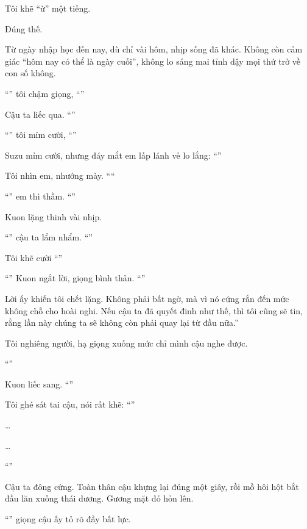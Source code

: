 \documentclass[../main.tex]{subfiles}
\begin{document}
Tôi khẽ ``ừ'' một tiếng.

Đúng thế.

Từ ngày nhập học đến nay, dù chỉ vài hôm, nhịp sống đã khác. Không còn cảm giác ``hôm nay có thể là ngày cuối'', không lo sáng mai tỉnh dậy mọi thứ trở về con số không.

``'' tôi chậm giọng, ``''

Cậu ta liếc qua. ``''

``'' tôi mỉm cười, ``''

Suzu mỉm cười, nhưng đáy mắt em lấp lánh vẻ lo lắng: ``''

Tôi nhìn em, nhướng mày. ````

``'' em thì thầm. ``''

Kuon lặng thinh vài nhịp.

``'' cậu ta lẩm nhẩm. ``''

Tôi khẽ cười ``''

``'' Kuon ngắt lời, giọng bình thản. ``''

Lời ấy khiến tôi chết lặng. Không phải bất ngờ, mà vì nó cứng rắn đến mức không chỗ cho hoài nghi. Nếu cậu ta đã quyết đinh như thế, thì tôi cũng sẽ tin, rằng lần này chúng ta sẽ không còn phải quay lại từ đầu nữa.''

\il

Tôi nghiêng người, hạ giọng xuống mức chỉ mình cậu nghe được.

``''

Kuon liếc sang. ``''

Tôi ghé sát tai cậu, nói rất khẽ: ``''

\dots

\dots

``''

Cậu ta đông cứng. Toàn thân cậu khựng lại đúng một giây, rồi mồ hôi hột bắt đầu lăn xuống thái dương. Gương mặt đỏ hỏn lên.

``'' giọng cậu ấy tỏ rõ đầy bất lực.
\end{document}
